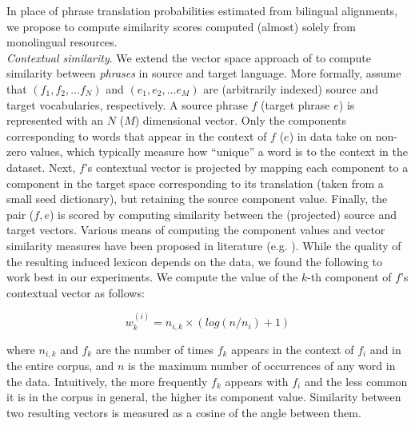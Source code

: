 \documentclass[11pt]{article}
\begin{document}
In place of phrase translation probabilities estimated from bilingual alignments, we propose to compute similarity scores computed (almost) solely from monolingual resources.\\

\noindent\emph{Contextual similarity}.  We extend the vector space approach of \cite{Rapp:1999} to compute similarity between \emph{phrases} in source and target language.  More formally, assume that $(f_{1}, f_{2}, \dots f_{N})$ and $(e_{1}, e_{2}, \dots e_{M})$ are (arbitrarily indexed) source and target vocabularies, respectively.  A source phrase $f$ (target phrase $e$) is represented with an $N$ ($M$) dimensional vector.  Only the components corresponding to words that appear in the context of $f$ ($e$) in data take on non-zero values, which typically measure how ``unique'' a word is to the context in the dataset.  Next, $f$'s contextual vector is projected by mapping each component to a component in the target space corresponding to its translation (taken from a small seed dictionary), but retaining the source component value.  Finally, the pair ($f, e$) is scored by computing similarity between the (projected) source and target vectors.  Various means of computing the component values and vector similarity measures have been proposed in literature (e.g. \cite{Rapp:1999,Fung:1998}).  While the quality of the resulting induced lexicon depends on the data, we found the following to work best in our experiments.  We compute the value of the $k$-th component of $f$'s contextual vector  as follows: 

\begin{equation*}
w_{k}^{(i)} = n_{i,k} \times (log( {n / n_{i}}) + 1)
\end{equation*}

\noindent where $n_{i,k}$ and $f_{k}$ are the number of times $f_{k}$ appears in the context of $f_{i}$ and in the entire corpus, and $n$ is the maximum number of occurrences of any word in the data.  Intuitively, the more frequently $f_{k}$ appears with $f_{i}$ and the less common it is in the corpus in general, the higher its component value.  Similarity between two resulting vectors is measured as a cosine of the angle between them.\\
\end{document}
